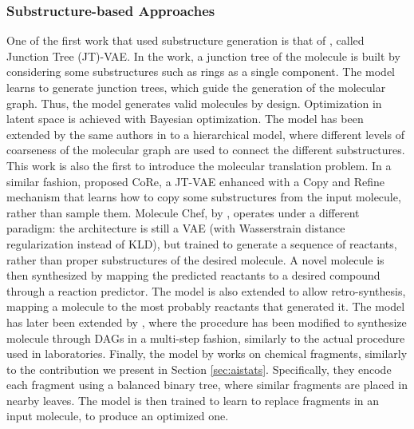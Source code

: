 \subsubsection*{Substructure-based Approaches}
One of the first work that used substructure generation is that of \citet{jin2018jtvae}, called Junction Tree (JT)-VAE. In the work, a junction tree of the molecule is built by considering some substructures such as rings as a single component. The model learns to generate junction trees, which guide the generation of the molecular graph. Thus, the model generates valid molecules by design. Optimization in latent space is achieved with Bayesian optimization. The model has been extended by the same authors in \citep{jin2019multimodalmoltranslation} to a hierarchical model, where different levels of coarseness of the molecular graph are used to connect the different substructures. This work is also the first to introduce the molecular translation problem. In a similar fashion, \citet{fu2020core} proposed CoRe, a JT-VAE enhanced with a Copy and Refine mechanism that learns how to copy some substructures from the input molecule, rather than sample them. Molecule Chef, by \citet{bradshaw2019moleculechef}, operates under a different paradigm: the architecture is still a VAE (with Wasserstrain distance regularization instead of KLD), but trained to generate a sequence of reactants, rather than proper substructures of the desired molecule. A novel molecule is then synthesized by mapping the predicted reactants to a desired compound through a reaction predictor. The model is also extended to allow retro-synthesis, \ie mapping a molecule to the most probably reactants that generated it. The model has later been extended by \citet{bradshaw2020barking}, where the procedure has been modified to synthesize molecule through DAGs in a multi-step fashion, similarly to the actual procedure used in laboratories. Finally, the model by \citet{bostrom2019fragments} works on chemical fragments, similarly to the contribution we present in Section \ref{sec:aistats}. Specifically, they encode each fragment using a balanced binary tree, where similar fragments are placed in nearby leaves. The model is then trained to learn to replace fragments in an input molecule, to produce an optimized one.

